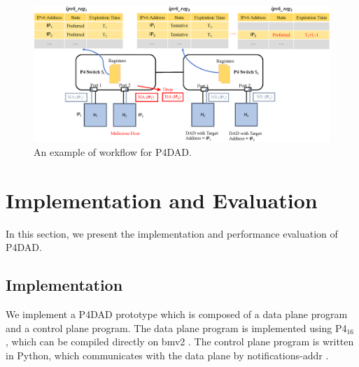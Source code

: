 \documentclass[journal]{IEEEtran}
\begin{document}
        \begin{figure}
            \centerline{
                \includegraphics[scale=0.56]{figure/Workflow.eps}
            }
            \vspace{-0.3cm}
            \caption{An example of workflow for P4DAD.}
            \label{fig:P4DAD-Workflow}
            \vspace{-0.3cm}
        \end{figure}







\section{Implementation and Evaluation}\label{sec:implementation and evaluation}
    In this section, we present the implementation and performance evaluation of P4DAD. 
    
    \subsection{Implementation}
        We implement a P4DAD prototype which is composed of a data plane program and a control plane program. The data plane program is implemented using P4$_{16}$ \cite{P4-16}, which can be compiled directly on bmv2 \cite{bmv2}. The control plane program is written in Python, which communicates with the data plane by notifications-addr \cite{bmv2}.
\end{document}

